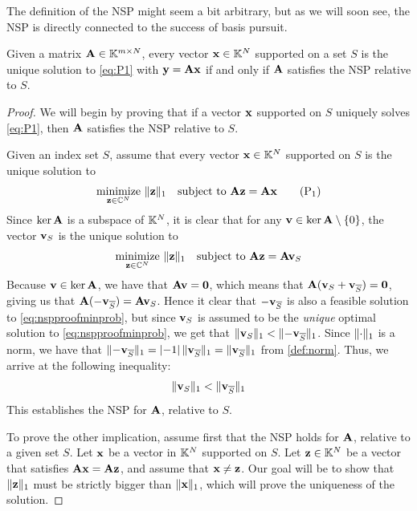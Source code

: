 The definition of the NSP might seem a bit arbitrary, but as we will soon see, the NSP is directly connected to the success of basis pursuit.

\begin{theorem}
	\label{thm:NSP_to_basis_special}
	Given a matrix $ \mathbf{A} \in \mathbb{K}^{m \times N} $, every vector $ \mathbf{x} \in \mathbb{K}^{N} $ supported on a set $ S $ is the unique solution to \eqref{eq:P1} with $ \mathbf{y} = \mathbf{A}\mathbf{x} $ if and only if $ \mathbf{A} $ satisfies the NSP relative to $ S $. 
\end{theorem}

\begin{proof}
	We will begin by proving that if a vector $ \mathbf{x} $ supported on $ S $ uniquely solves \eqref{eq:P1}, then $ \mathbf{A} $ satisfies the NSP relative to $ S $.
	
	Given an index set $ S $, assume that every vector $ \mathbf{x} \in \mathbb{K}^{N} $ supported on $ S $ is the unique solution to
	\[
		\underset{\mathbf{z} \in \mathbb{C}^{N}}{\text{minimize}}~ \lVert\mathbf{z}\rVert_1
		\quad\text{subject to}~ \mathbf{A}\mathbf{z} = \mathbf{A}\mathbf{x}
		\tag{P$_1$}
	\]
	Since $ \ker\mathbf{A} $ is a subspace of $ \mathbb{K}^{N} $, it is clear that for any $ \mathbf{v} \in \ker\mathbf{A}\setminus\{0\} $, the vector $ \mathbf{v}_{S} $ is the unique solution to 
	\begin{equation}
		\label{eq:nspproofminprob}
		\underset{\mathbf{z} \in \mathbb{C}^{N}}{\text{minimize}}~ \lVert\mathbf{z}\rVert_1
		\quad\text{subject to}~ \mathbf{A}\mathbf{z} = \mathbf{A}\mathbf{v}_{S}
	\end{equation}
	Because $ \mathbf{v} \in \ker\mathbf{A} $, we have that $ \mathbf{A}\mathbf{v} = \mathbf{0} $, which means that $ \mathbf{A}(\mathbf{v}_{S} + \mathbf{v}_{\overline{S}}) = \mathbf{0} $, giving us that $ \mathbf{A}(-\mathbf{v}_{\overline{S}}) = \mathbf{A}\mathbf{v}_{S} $. Hence it clear that $ -\mathbf{v}_{\overline{S}} $ is also a feasible solution to \eqref{eq:nspproofminprob}, but since $ \mathbf{v}_{S} $ is assumed to be the \textit{unique} optimal solution to \eqref{eq:nspproofminprob}, we get that $ \lVert\mathbf{v}_{S}\rVert_{1} < \lVert-\mathbf{v}_{\overline{S}}\rVert_{1} $. Since $ \lVert\cdot\rVert_{1} $ is a norm, we have that $ \lVert-\mathbf{v}_{\overline{S}}\rVert_{1} = \left|-1\right|\lVert\mathbf{v}_{\overline{S}}\rVert_{1} = \lVert\mathbf{v}_{\overline{S}}\rVert_{1} $ from \cref{def:norm}. Thus, we arrive at the following inequality:
	\[
		\lVert\mathbf{v}_{S}\rVert_{1} < \lVert\mathbf{v}_{\overline{S}}\rVert_{1}
	\]
	This establishes the NSP for $ \mathbf{A} $, relative to $ S $.
	
	To prove the other implication, assume first that the NSP holds for $ \mathbf{A} $, relative to a given set $ S $. Let $ \mathbf{x} $ be a vector in $ \mathbb{K}^{N} $ supported on $ S $. Let $ \mathbf{z} \in \mathbb{K}^{N} $ be a vector that satisfies $ \mathbf{A}\mathbf{x} = \mathbf{A}\mathbf{z} $, and assume that $ \mathbf{x} \neq \mathbf{z} $. Our goal will be to show that $ \lVert\mathbf{z}\rVert_{1} $ must be strictly bigger than $ \lVert\mathbf{x}\rVert_{1} $, which will prove the uniqueness of the solution. 
	

\end{proof}
